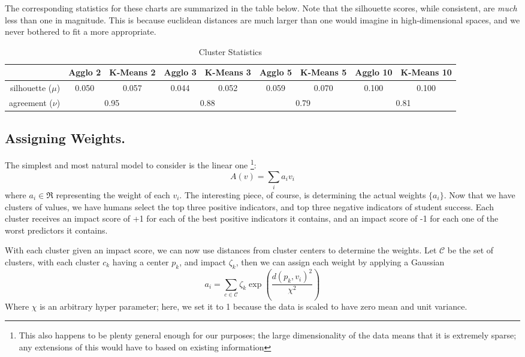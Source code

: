 \documentclass[paper.tex]{subfiles}
\begin{document}
	The corresponding statistics for these charts are summarized in the table below. Note that the silhouette scores, while consistent, are \emph{much} less than one in magnitude. This is because euclidean distances are much larger than one would imagine in high-dimensional spaces, and we never bothered to fit a more appropriate. 
	
	\begin{table}[!h]
		\caption{Cluster Statistics}
		\def\arraystretch{1.2}%
		\begin{tabular}{r||cc|cc|cc|cc|}
			 &\small Agglo 2 &\small K-Means 2 &\small Agglo 3 &\small K-Means 3 &\small Agglo 5 &\small  K-Means 5 &\small Agglo 10 &\small K-Means 10\\\hline
		\small silhouette ($\mu$)& 0.050 & 0.057 & 0.044 & 0.052 & 0.059 & 0.070 & 0.100 & 0.100 \\
		\small agreement ($\nu$)  & \multicolumn{2}{|c|}{0.95} & \multicolumn{2}{|c|}{0.88} & \multicolumn{2}{|c|}{0.79}& \multicolumn{2}{|c|}{0.81}\\\hline
		\end{tabular}		\label{t1}
	\end{table}
		
	\subsection{Assigning Weights.}
	The simplest and most natural model to consider is the linear one \footnote{This also happens to be plenty general enough for our purposes; the large dimensionality of the data means that it is extremely sparse; any extensions of this would have to based on existing information}:
	\[A(v) = \sum_i a_i v_i \]
	where $a_i \in \Re$ representing the weight of each $v_i$. The interesting piece, of course, is determining the actual weights $\{a_i\}$. Now that we have clusters of values, we have humans select the top three positive indicators, and top three negative indicators of student success. Each cluster receives an impact score of +1 for each of the best positive indicators it contains, and an impact score of -1 for each one of the worst predictors it contains. 
	
	With each cluster given an impact score, we can now use distances from cluster centers to determine the weights. Let $\mathcal{C}$ be the set of clusters, with each cluster $c_k$ having a center $p_k$, and impact $\zeta_k$, then we can assign each weight by applying a Gaussian
	\[ a_i = \sum_{c \in \mathcal{C}} \zeta_k\exp \left(\frac{d(p_k, v_i)^2}{\chi^2} \right) \]
	Where $\chi$ is an arbitrary hyper parameter; here, we set it to 1 because the data is scaled to have zero mean and unit variance.
	
	
\end{document}
